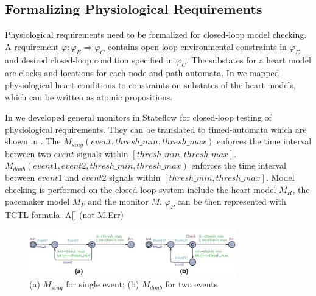 \subsection{Formalizing Physiological Requirements}
%
%
Physiological requirements need to be formalized for closed-loop model checking. A requirement $\varphi: \varphi_E\Rightarrow \varphi_C$ contains open-loop environmental constraints in $\varphi_E$ and desired closed-loop condition specified in $\varphi_C$.  The substates for a heart model are clocks and locations for each node and path automata. In \cite{vhm_iccps11} we mapped physiological heart conditions to constraints on substates of the heart models, which can be written as atomic propositions.

In \cite{vhm_iccps11} we developed general monitors in Stateflow for closed-loop testing of physiological requirements. They can be translated to timed-automata which are shown in . The $M_{sing}(event,thresh\_min, thresh\_max)$ enforces the time interval between two $event$ signals within $[thresh\_min,thresh\_max]$. \\
$M_{doub}(event1,event2,thresh\_min,thresh\_max)$ enforces the time interval between $event1$ and $event2$ signals within $[thresh\_min,thresh\_max]$. Model checking is performed on the closed-loop system include the heart model $M_H$, the pacemaker model $M_P$ and the monitor $M$. $\varphi_P$ can be then represented with TCTL formula:
 \textsf{A[] (not M.Err)}
\begin{figure}[!b]
		\centering
		\includegraphics[width=0.8\textwidth]{figs/monitor.pdf}
		\caption{\small (a) $M_{sing}$ for single event; (b) $M_{doub}$ for two events}
		\label{fig:monitor}
\end{figure}
%